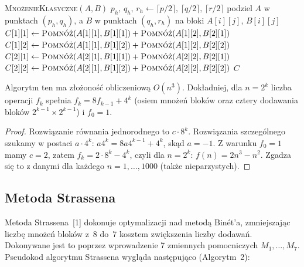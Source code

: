 \documentclass[11pt,a4paper]{article}
\newcommand{\Pomnoz}{\textsc{Pomnóż}}
\begin{document}
\begin{algorithm}[H]
\caption{Rekurencyjne mnożenie macierzy metodą Binét'a}
\begin{algorithmic}[1]
\Procedure{\Pomnoz}{$A, B$} 
    \State \Return \textsc{MnożenieKlasyczne}$(A,B)$
  \EndIf
  \State $p_h,\,q_h,\,r_h \gets \lceil p/2\rceil,\,\lceil q/2\rceil,\,\lceil r/2\rceil$ 
  \State podziel $A$ w punktach $(p_h,q_h)$, a $B$ w punktach $(q_h,r_h)$ na bloki $A[i][j]$, $B[i][j]$
  \State $C[1][1] \gets \Pomnoz(A[1][1],B[1][1]) + \Pomnoz(A[1][2],B[2][1])$
  \State $C[1][2] \gets \Pomnoz(A[1][1],B[1][2]) + \Pomnoz(A[1][2],B[2][2])$
  \State $C[2][1] \gets \Pomnoz(A[2][1],B[1][1]) + \Pomnoz(A[2][2],B[2][1])$
  \State $C[2][2] \gets \Pomnoz(A[2][1],B[1][2]) + \Pomnoz(A[2][2],B[2][2])$
  \State \Return $C$
\EndProcedure
\end{algorithmic}
\end{algorithm}

Algorytm ten ma złożoność obliczeniową $O(n^3)$. Dokładniej, dla $n=2^k$ liczba operacji $f_k$ spełnia
$f_k=8f_{k-1}+4^k$ (osiem mnożeń bloków oraz cztery dodawania bloków $2^{k-1}\times2^{k-1}$) i $f_0=1$.

\begin{proof}
Rozwiązanie równania jednorodnego to $c\cdot8^k$. Rozwiązania szczególnego szukamy w postaci $a\cdot4^k$:
$a4^k=8a4^{k-1}+4^k$, skąd $a=-1$. Z warunku $f_0=1$ mamy $c=2$, zatem
$f_k=2\cdot8^k-4^k$, czyli dla $n=2^k$: $f(n)=2n^3-n^2$. Zgadza się to z danymi dla każdego $n=1,\dots,1000$
(także nieparzystych).
\end{proof}

\clearpage
\subsection{Metoda Strassena}
Metoda Strassena~[1] dokonuje optymalizacji nad metodą Binét'a, zmniejszając liczbę mnożeń bloków z~8 do~7 kosztem
zwiększenia liczby dodawań. Dokonywane jest to poprzez wprowadzenie 7 zmiennych pomocniczych $M_1,\dots,M_7$.
Pseudokod algorytmu Strassena wygląda następująco (Algorytm~2):
\end{document}
